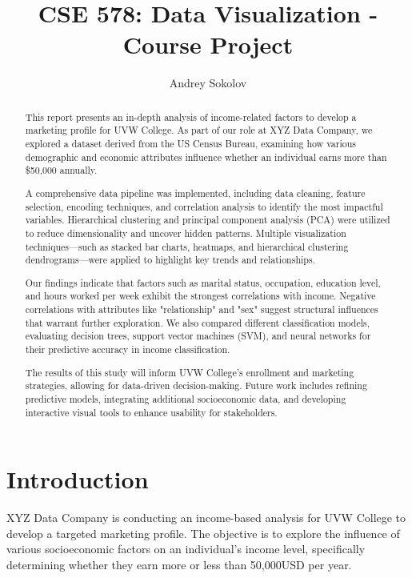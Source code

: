 \documentclass[journal]{IEEEtran}
\begin{document}
\title{CSE 578: Data Visualization - Course Project}

\author{Andrey Sokolov}

\maketitle

\begin{abstract}
    This report presents an in-depth analysis of income-related factors to develop a
    marketing profile for UVW College. As part of our role at XYZ Data Company, we
    explored a dataset derived from the US Census Bureau, examining how various
    demographic and economic attributes influence whether an individual earns more than \$50,000 annually. 
    
    A comprehensive data pipeline was implemented, including data cleaning, feature
    selection, encoding techniques, and correlation analysis to identify the most
    impactful variables. Hierarchical clustering and principal component analysis
    (PCA) were utilized to reduce dimensionality and uncover hidden patterns.
    Multiple visualization techniques—such as stacked bar charts, heatmaps, and hierarchical clustering dendrograms—were applied to highlight key trends and relationships.
    
    Our findings indicate that factors such as marital status, occupation,
    education level, and hours worked per week exhibit the strongest correlations
    with income. Negative correlations with attributes like "relationship" and
    "sex" suggest structural influences that warrant further exploration.
    We also compared different classification models, evaluating decision trees,
    support vector machines (SVM), and neural networks for their predictive accuracy in income classification.
    
    The results of this study will inform UVW College’s enrollment and marketing strategies,
    allowing for data-driven decision-making. Future work includes refining predictive models,
    integrating additional socioeconomic data, and developing interactive visual tools to enhance usability for stakeholders.
    \end{abstract}

\section{Introduction}
XYZ Data Company is conducting an income-based analysis for UVW College to develop
a targeted marketing profile. The objective is to explore the influence of various
socioeconomic factors on an individual’s income level, specifically determining
whether they earn more or less than 50,000USD per year.
\end{document}
